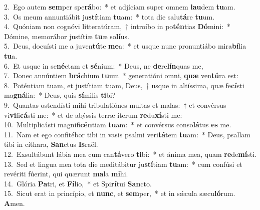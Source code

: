 {2.~}Ego autem \textbf{sem}per spe\textbf{rá}bo:~* et adjíciam super omnem \textbf{lau}dem \textbf{tu}am.\\
{3.~}Os meum annuntiábit ju\textbf{stí}tiam \textbf{tu}am:~* tota die salu\textbf{tá}re \textbf{tu}um.\\
{4.~}Quóniam non cognóvi litteratúram,~† introíbo in po\textbf{tén}tias \textbf{Dó}mini:~* Dómine, memorábor justítiæ \textbf{tu}æ so\textbf{lí}us.\\
{5.~}Deus, docuísti me a juven\textbf{tú}te \textbf{me}a:~* et usque nunc pronuntiábo mira\textbf{bí}lia \textbf{tu}a.\\
{6.~}Et usque in se\textbf{né}ctam et \textbf{sé}nium:~* Deus, ne \textbf{de}re\textbf{lín}quas me,\\
{7.~}Donec annúntiem \textbf{brá}chium \textbf{tu}um~* generatióni omni, \textbf{quæ} ven\textbf{tú}ra est:\\
{8.~}Poténtiam tuam, et justítiam tuam, Deus,~† usque in altíssima, quæ fe\textbf{cí}sti ma\textbf{gná}lia:~* Deus, quis \textbf{sí}milis \textbf{ti}bi?\\
{9.~}Quantas ostendísti mihi tribulatiónes multas et malas:~† et convérsus vi\textbf{vi}fi\textbf{cá}sti me:~* et de abýssis terræ íterum \textbf{re}du\textbf{xí}sti me:\\
{10.~}Multiplicásti magnifi\textbf{cén}tiam \textbf{tu}am:~* et convérsus conso\textbf{lá}tus \textbf{es} me.\\
{11.~}Nam et ego confitébor tibi in vasis psalmi veri\textbf{tá}tem \textbf{tu}am:~* Deus, psallam tibi in cíthara, \textbf{San}ctus \textbf{Is}raël.\\
{12.~}Exsultábunt lábia mea cum can\textbf{tá}vero \textbf{ti}bi:~* et ánima mea, quam \textbf{re}de\textbf{mí}sti.\\
{13.~}Sed et lingua mea tota die meditábitur ju\textbf{stí}tiam \textbf{tu}am:~* cum confúsi et revériti fúerint, qui quærunt \textbf{ma}la \textbf{mi}hi.\\
{14.~}Glória \textbf{Pa}tri, et \textbf{Fí}lio,~* et Spi\textbf{rí}tui \textbf{San}cto.\\
{15.~}Sicut erat in princípio, et \textbf{nunc}, et \textbf{sem}per,~* et in sǽcula sæcu\textbf{ló}rum. \textbf{A}men.\\
